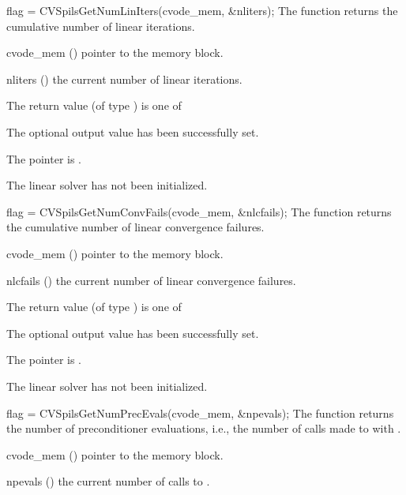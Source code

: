 {
  flag = CVSpilsGetNumLinIters(cvode\_mem, \&nliters);
}
{
  The function  returns the
  cumulative number of linear iterations.
}
{
  \begin{args}
  \item[cvode\_mem] ()
    pointer to the {\cvode} memory block.
  \item[nliters] ()
    the current number of linear iterations.
  \end{args}
}
{
  The return value  (of type ) is one of
  \begin{args}
  \item[\Id{CVSPILS\_SUCCESS}]
    The optional output value has been successfully set.
  \item[\Id{CVSPILS\_MEM\_NULL}]
    The  pointer is .
  \item[\Id{CVSPILS\_LMEM\_NULL}]
    The {\cvspils} linear solver has not been initialized.
  \end{args}
}
{}
{
  flag = CVSpilsGetNumConvFails(cvode\_mem, \&nlcfails);
}
{
  The function  returns the
  cumulative number of linear convergence failures.
}
{
  \begin{args}
  \item[cvode\_mem] ()
    pointer to the {\cvode} memory block.
  \item[nlcfails] ()
    the current number of linear convergence failures.
  \end{args}
}
{
  The return value  (of type ) is one of
  \begin{args}
  \item[\Id{CVSPILS\_SUCCESS}]
    The optional output value has been successfully set.
  \item[\Id{CVSPILS\_MEM\_NULL}]
    The  pointer is .
  \item[\Id{CVSPILS\_LMEM\_NULL}]
    The {\cvspils} linear solver has not been initialized.
  \end{args}
}
{}
{
  flag = CVSpilsGetNumPrecEvals(cvode\_mem, \&npevals);
}
{
  The function  returns the
  number of preconditioner evaluations, i.e., the number of
  calls made to  with .
}
{
  \begin{args}
  \item[cvode\_mem] ()
    pointer to the {\cvode} memory block.
  \item[npevals] ()
    the current number of calls to .
  \end{args}
}
